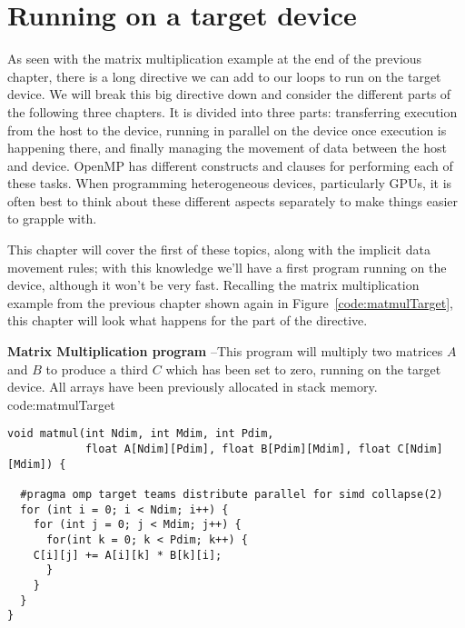 
\def\ArtDir{03.Target/figures}%
 
\chapter{Running on a target device}
\label{chapter:target}

As seen with the matrix multiplication example at the end of the previous chapter, there is a long directive we can add to our loops to run on the target device.
We will break this big directive down and consider the different parts of the following three chapters.
It is divided into three parts: transferring execution from the host to the device, running in parallel on the device once execution is happening there, and finally managing the movement of data between the host and device.
OpenMP has different constructs and clauses for performing each of these tasks.
When programming heterogeneous devices, particularly GPUs, it is often best to think about these different aspects separately to make things easier to grapple with.

This chapter will cover the first of these topics, along with the implicit data movement rules; with this knowledge we'll have a first program running on the device, although it won't be very fast.
Recalling the matrix multiplication example from the previous chapter shown again in Figure~\ref{code:matmulTarget}, this chapter will look what happens for the  part of the directive.

\begin{CodeExample}%
{\textbf{Matrix Multiplication program} --\small This program will multiply two matrices $A$ and $B$
to produce a third $C$ which has been set to zero, running on the target device.
All arrays have been previously allocated in stack memory.
}%
{code:matmulTarget}
\begin{lstlisting}
void matmul(int Ndim, int Mdim, int Pdim,
            float A[Ndim][Pdim], float B[Pdim][Mdim], float C[Ndim][Mdim]) {

  #pragma omp target teams distribute parallel for simd collapse(2)
  for (int i = 0; i < Ndim; i++) {
    for (int j = 0; j < Mdim; j++) {
      for(int k = 0; k < Pdim; k++) {
	C[i][j] += A[i][k] * B[k][i];
      }
    }
  }
}
\end{lstlisting}
\end{CodeExample}

